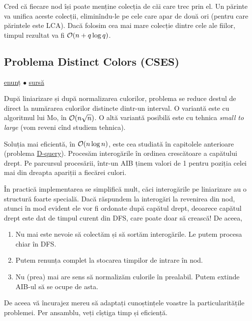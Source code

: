 \documentclass[../main.tex]{subfiles}
\begin{document}
Cred că fiecare nod își poate menține colecția de căi care trec prin el. Un părinte va unifica aceste colecții, eliminîndu-le pe cele care apar de două ori (pentru care părintele este LCA). Dacă folosim cea mai mare colecție dintre cele ale fiilor, timpul rezultat va fi $\mathcal{O}(n + q \log q)$.

\subsection{Problema Distinct Colors (CSES)}
\label{problem:distinct-colors}

\href{https://cses.fi/problemset/task/1139}{enunț}
$\bullet$
\hyperref[code:distinct-colors]{sursă}

După liniarizare și după normalizarea culorilor, problema se reduce destul de direct la numărarea culorilor distincte dintr-un interval. O variantă este cu algoritmul lui Mo, în $\mathcal{O}(n \sqrt{n})$. O altă variantă posibilă este cu tehnica \textit{small to large} (vom reveni cînd studiem tehnica).

Soluția mai eficientă, în $\mathcal{O}(n \log n)$, este cea studiată în capitolele anterioare (problema \href{https://www.spoj.com/problems/DQUERY/}{D-query}). Procesăm interogările în ordinea crescătoare a capătului drept. Pe parcursul procesării, într-un AIB ținem valori de 1 pentru poziția celei mai din dreapta apariții a fiecărei culori.

În practică implementarea se simplifică mult, căci interogările pe liniarizare au o structură foarte specială. Dacă răspundem la interogări la revenirea din nod, atunci în mod evident ele vor fi ordonate după capătul drept, deoarece capătul drept este dat de timpul curent din DFS, care poate doar să crească! De aceea,

\begin{enumerate}
  \item Nu mai este nevoie să colectăm și să sortăm interogările. Le putem procesa chiar în DFS.

  \item Putem renunța complet la stocarea timpilor de intrare în nod.

  \item Nu (prea) mai are sens să normalizăm culorile în prealabil. Putem extinde AIB-ul să se ocupe de asta.
\end{enumerate}

De aceea vă încurajez mereu să adaptați cunoștințele voastre la particularitățile problemei. Per ansamblu, veți cîștiga timp și eficiență.
\end{document}
